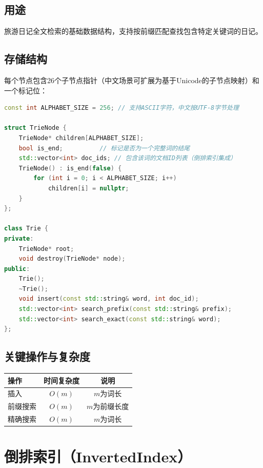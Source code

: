 \documentclass[12pt,a4paper]{report}
\begin{document}
\subsection{用途}
旅游日记全文检索的基础数据结构，支持按前缀匹配查找包含特定关键词的日记。

\subsection{存储结构}

每个节点包含26个子节点指针（中文场景可扩展为基于Unicode的子节点映射）和一个标记位：

\begin{lstlisting}[language=C++, caption={Trie树数据结构定义}]
const int ALPHABET_SIZE = 256; // 支持ASCII字符，中文按UTF-8字节处理

struct TrieNode {
    TrieNode* children[ALPHABET_SIZE];
    bool is_end;          // 标记是否为一个完整词的结尾
    std::vector<int> doc_ids; // 包含该词的文档ID列表（倒排索引集成）
    TrieNode() : is_end(false) {
        for (int i = 0; i < ALPHABET_SIZE; i++)
            children[i] = nullptr;
    }
};

class Trie {
private:
    TrieNode* root;
    void destroy(TrieNode* node);
public:
    Trie();
    ~Trie();
    void insert(const std::string& word, int doc_id);
    std::vector<int> search_prefix(const std::string& prefix);
    std::vector<int> search_exact(const std::string& word);
};
\end{lstlisting}

\subsection{关键操作与复杂度}

\begin{table}[H]
\centering
\begin{tabular}{lcc}
\toprule
\textbf{操作} & \textbf{时间复杂度} & \textbf{说明} \\
\midrule
插入 & $O(m)$ & $m$为词长 \\
前缀搜索 & $O(m)$ & $m$为前缀长度 \\
精确搜索 & $O(m)$ & $m$为词长 \\
\bottomrule
\end{tabular}
\end{table}


\section{倒排索引（InvertedIndex）}
\end{document}
